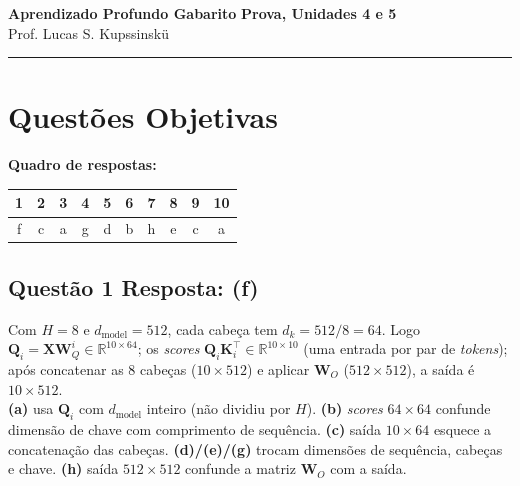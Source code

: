 \documentclass[11pt,a4paper]{article}
\begin{document}
{\Large\bfseries Aprendizado Profundo \textemdash{} Gabarito} \hfill \textbf{Prova, Unidades 4 e 5}\\
Prof. Lucas S. Kupssinskü

\rule{\linewidth}{0.8pt}

\section*{Questões Objetivas}

\textbf{Quadro de respostas:}
\begin{center}
\begin{tabular}{|c|c|c|c|c|c|c|c|c|c|}
\hline
1 & 2 & 3 & 4 & 5 & 6 & 7 & 8 & 9 & 10 \\\hline
f & c & a & g & d & b & h & e & c & a \\\hline
\end{tabular}
\end{center}

\color{blue}


\subsection*{Questão 1 \textemdash{} Resposta: (f)}
Com $H = 8$ e $d_{\text{model}} = 512$, cada cabeça tem $d_k = 512/8 = 64$. Logo $\mathbf{Q}_i = \mathbf{X} \mathbf{W}_Q^i \in \mathbb{R}^{10 \times 64}$; os \textit{scores} $\mathbf{Q}_i \mathbf{K}_i^\top \in \mathbb{R}^{10 \times 10}$ (uma entrada por par de \textit{tokens}); após concatenar as $8$ cabeças ($10 \times 512$) e aplicar $\mathbf{W}_O$ ($512\times 512$), a saída é $10 \times 512$.\\
\textbf{(a)} usa $\mathbf{Q}_i$ com $d_{\text{model}}$ inteiro (não dividiu por $H$).
\textbf{(b)} \textit{scores} $64\times 64$ confunde dimensão de chave com comprimento de sequência.
\textbf{(c)} saída $10\times 64$ esquece a concatenação das cabeças.
\textbf{(d)/(e)/(g)} trocam dimensões de sequência, cabeças e chave.
\textbf{(h)} saída $512\times 512$ confunde a matriz $\mathbf{W}_O$ com a saída.
\end{document}
